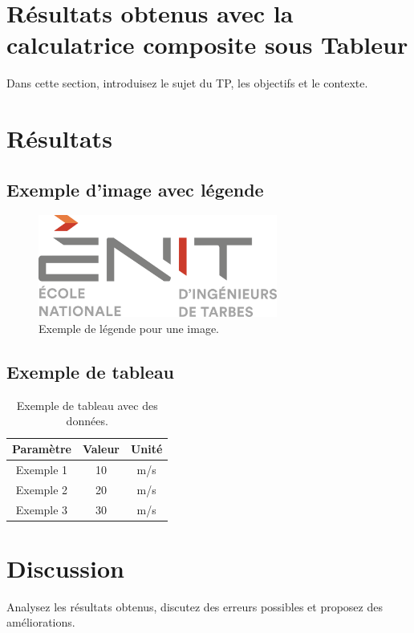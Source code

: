 \documentclass[a4paper,12pt]{article}
\begin{document}
\section{Résultats obtenus avec la calculatrice composite sous Tableur}
Dans cette section, introduisez le sujet du TP, les objectifs et le contexte.

\section{Résultats}
\subsection{Exemple d'image avec légende}
\begin{figure}[h!]
	\centering
	\includegraphics[width=0.7\textwidth]{media/logo-enit-2454399073.png} %
	\caption{Exemple de légende pour une image.}
	\label{fig:exemple_image}
\end{figure}

\subsection{Exemple de tableau}
\begin{table}[h!]
	\centering
	\begin{tabular}{|c|c|c|}
		\hline
		\textbf{Paramètre} & \textbf{Valeur} & \textbf{Unité} \\
		\hline
		Exemple 1          & 10              & m/s            \\
		Exemple 2          & 20              & m/s            \\
		Exemple 3          & 30              & m/s            \\
		\hline
	\end{tabular}
	\caption{Exemple de tableau avec des données.}
	\label{tab:exemple_tableau}
\end{table}

\section{Discussion}
Analysez les résultats obtenus, discutez des erreurs possibles et proposez des améliorations.
\end{document}
